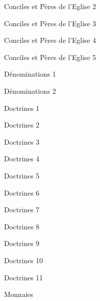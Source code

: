 \documentclass[11pt]{book}
\begin{document}
\begin{center}Conciles et Pères de l'Eglise 2\end{center}\clearpage
\begin{center}Conciles et Pères de l'Eglise 3\end{center}\clearpage
\begin{center}Conciles et Pères de l'Eglise 4\end{center}\clearpage
\begin{center}Conciles et Pères de l'Eglise 5\end{center}\clearpage
\clearpage
\begin{center}Dénominations 1\end{center}\clearpage
\begin{center}Dénominations 2\end{center}\clearpage
\clearpage
\begin{center}Doctrines 1\end{center}\clearpage
\begin{center}Doctrines 2\end{center}\clearpage
\begin{center}Doctrines 3\end{center}\clearpage
\begin{center}Doctrines 4\end{center}\clearpage
\begin{center}Doctrines 5\end{center}\clearpage
\begin{center}Doctrines 6\end{center}\clearpage
\begin{center}Doctrines 7\end{center}\clearpage
\begin{center}Doctrines 8\end{center}\clearpage
\begin{center}Doctrines 9\end{center}\clearpage
\begin{center}Doctrines 10\end{center}\clearpage
\begin{center}Doctrines 11\end{center}\clearpage
\clearpage
\begin{center}Monnaies\end{center}\clearpage
\end{document}
